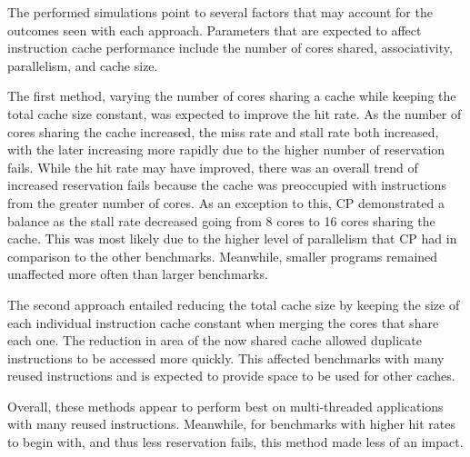 The performed simulations point to several factors that may account 
for the outcomes seen with each approach. Parameters that are expected 
to affect instruction cache performance include the number of cores 
shared, associativity, parallelism, and cache size.

The first method, varying the number of cores sharing a cache while 
keeping the total cache size constant, was expected to improve the hit 
rate. As the number of cores sharing the cache increased, the miss rate 
and stall rate both increased, with the later increasing more rapidly 
due to the higher number of reservation fails. While the hit rate may 
have improved, there was an overall trend of increased reservation fails 
because the cache was preoccupied with instructions from the greater 
number of cores. As an exception to this, CP demonstrated a balance as 
the stall rate decreased going from 8 cores to 16 cores sharing the 
cache. This was most likely due to the higher level of parallelism that 
CP had in comparison to the other benchmarks. Meanwhile, smaller programs 
remained unaffected more often than larger benchmarks.

The second approach entailed reducing the total cache size by keeping 
the size of each individual instruction cache constant when merging the 
cores that share each one. The reduction in area of the now shared cache 
allowed duplicate instructions to be accessed more quickly. This 
affected benchmarks with many reused instructions and is expected to 
provide space to be used for other caches.

Overall, these methods appear to perform best on multi-threaded 
applications with many reused instructions. Meanwhile, for benchmarks 
with higher hit rates to begin with, and thus less reservation fails, 
this method made less of an impact.
